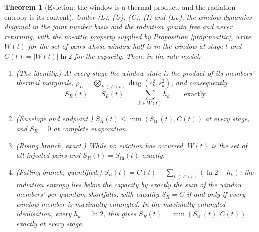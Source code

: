 \documentclass[11pt]{article}
\newtheorem{theorem}{Theorem}[section]
\theoremstyle{definition}
\newcommand{\Sth}{S_{\mathrm{th}}}
\begin{document}
\begin{theorem}[Eviction: the window is a thermal product, and the radiation entropy is its content]\label{thm:eviction}
Under (L), (U), (C), (I) and (L$_E$), the window dynamics diagonal in the joint number basis and the radiation quanta free and never returning, with the no-attic property supplied by Proposition \ref{prop:noattic}, write $W(t)$ for the set of pairs whose window half is in the window at stage $t$ and $C(t) = |W(t)|\ln 2$ for the capacity. Then, in the rate model:
\begin{enumerate}
\item (The identity.) At every stage the window state is the product of its members' thermal marginals, $\rho_L = \bigotimes_{k \in W(t)}\operatorname{diag}(c_k^{2}, s_k^{2})$, and consequently
\[
S_R(t) \;=\; S_L(t) \;=\; \sum_{k \in W(t)} h_k \qquad \text{exactly.}
\]
\item (Envelope and endpoint.) $S_R(t) \leq \min(\Sth(t), C(t))$ at every stage, and $S_R = 0$ at complete evaporation.
\item (Rising branch, exact.) While no eviction has occurred, $W(t)$ is the set of all injected pairs and $S_R(t) = \Sth(t)$ exactly.
\item (Falling branch, quantified.) $S_R(t) = C(t) - \sum_{k \in W(t)}(\ln 2 - h_k)$: the radiation entropy lies below the capacity by exactly the sum of the window members' per-quantum shortfalls, with equality $S_R = C$ if and only if every window member is maximally entangled. In the maximally entangled idealisation, every $h_k = \ln 2$, this gives $S_R(t) = \min(\Sth(t), C(t))$ exactly at every stage.
\end{enumerate}
\end{theorem}
\end{document}
